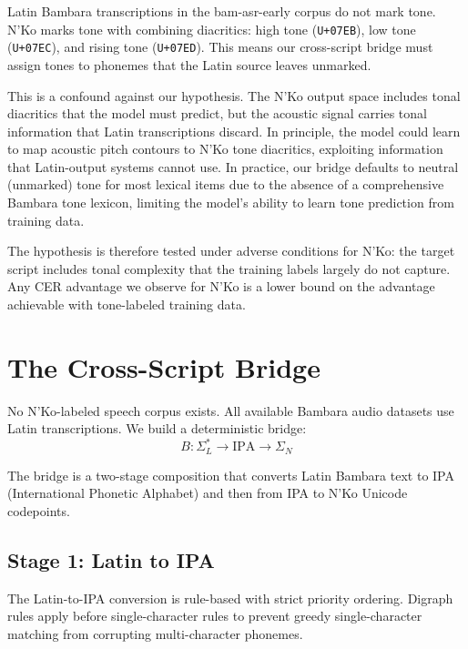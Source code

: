 \documentclass[11pt]{article}
\begin{document}
Latin Bambara transcriptions in the bam-asr-early corpus do not mark tone.
N'Ko marks tone with combining diacritics: high tone (\texttt{U+07EB}), low tone (\texttt{U+07EC}), and rising tone (\texttt{U+07ED}).
This means our cross-script bridge must assign tones to phonemes that the Latin source leaves unmarked.

This is a confound against our hypothesis.
The N'Ko output space includes tonal diacritics that the model must predict, but the acoustic signal carries tonal information that Latin transcriptions discard.
In principle, the model could learn to map acoustic pitch contours to N'Ko tone diacritics, exploiting information that Latin-output systems cannot use.
In practice, our bridge defaults to neutral (unmarked) tone for most lexical items due to the absence of a comprehensive Bambara tone lexicon, limiting the model's ability to learn tone prediction from training data.

The hypothesis is therefore tested under adverse conditions for N'Ko: the target script includes tonal complexity that the training labels largely do not capture.
Any CER advantage we observe for N'Ko is a lower bound on the advantage achievable with tone-labeled training data.

\section{The Cross-Script Bridge}
\label{sec:bridge}

No N'Ko-labeled speech corpus exists.
All available Bambara audio datasets use Latin transcriptions.
We build a deterministic bridge:
\begin{equation}
B: \Sigma_L^* \to \text{IPA} \to \Sigma_N
\end{equation}

The bridge is a two-stage composition that converts Latin Bambara text to IPA (International Phonetic Alphabet) and then from IPA to N'Ko Unicode codepoints.

\subsection{Stage 1: Latin to IPA}

The Latin-to-IPA conversion is rule-based with strict priority ordering.
Digraph rules apply before single-character rules to prevent greedy single-character matching from corrupting multi-character phonemes.
\end{document}
